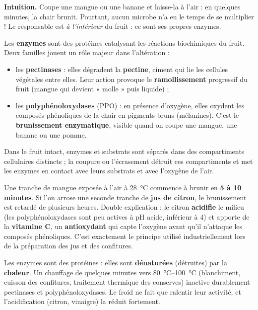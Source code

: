 \documentclass[11pt]{article}
\newcommand{\cle}[1]{{\popxbold\color{popdark}#1}}
\newcounter{popsec}
\newcounter{popsub}
\newcommand{\courssub}[1]{%
  \stepcounter{popsub}%
  \par\vspace{9pt}\noindent{\popxbold\fontsize{11.5}{13}\selectfont\color{popink}{\color{poporange}\thepopsec.\thepopsub}\hspace{6pt}#1}\par\nopagebreak\vspace{4pt}
}
\begin{document}
\courssub{Facteur 2 : les enzymes propres du fruit}

\textbf{Intuition.} Coupe une mangue ou une banane et laisse-la à l'air : en quelques minutes, la chair brunit. Pourtant, aucun microbe n'a eu le temps de se multiplier ! Le responsable est \emph{à l'intérieur} du fruit : ce sont ses propres \cle{enzymes}.

\begin{definition}
Les \textbf{enzymes} sont des protéines catalysant les réactions biochimiques du fruit. Deux familles jouent un rôle majeur dans l'altération :
\begin{itemize}
\item les \textbf{pectinases} : elles dégradent la \textbf{pectine}, ciment qui lie les cellules végétales entre elles. Leur action provoque le \textbf{ramollissement} progressif du fruit (mangue qui devient « molle » puis liquide) ;
\item les \textbf{polyphénoloxydases} (PPO) : en présence d'oxygène, elles oxydent les composés phénoliques de la chair en pigments bruns (mélanines). C'est le \textbf{brunissement enzymatique}, visible quand on coupe une mangue, une banane ou une pomme.
\end{itemize}
Dans le fruit intact, enzymes et substrats sont séparés dans des compartiments cellulaires distincts ; la coupure ou l'écrasement détruit ces compartiments et met les enzymes en contact avec leurs substrats et avec l'oxygène de l'air.
\end{definition}

\begin{exemplebox}
Une tranche de mangue exposée à l'air à \SI{28}{\celsius} commence à brunir en \textbf{5 à 10 minutes}. Si l'on arrose une seconde tranche de \textbf{jus de citron}, le brunissement est retardé de plusieurs heures. Double explication : le citron \textbf{acidifie} le milieu (les polyphénoloxydases sont peu actives à pH acide, inférieur à 4) et apporte de la \textbf{vitamine C}, un \textbf{antioxydant} qui capte l'oxygène avant qu'il n'attaque les composés phénoliques. C'est exactement le principe utilisé industriellement lors de la préparation des jus et des confitures.
\end{exemplebox}

\begin{propriete}
Les enzymes sont des protéines : elles sont \textbf{dénaturées} (détruites) par la \textbf{chaleur}. Un chauffage de quelques minutes vers \SIrange{80}{100}{\celsius} (blanchiment, cuisson des confitures, traitement thermique des conserves) inactive durablement pectinases et polyphénoloxydases. Le froid ne fait que ralentir leur activité, et l'acidification (citron, vinaigre) la réduit fortement.
\end{propriete}
\end{document}
